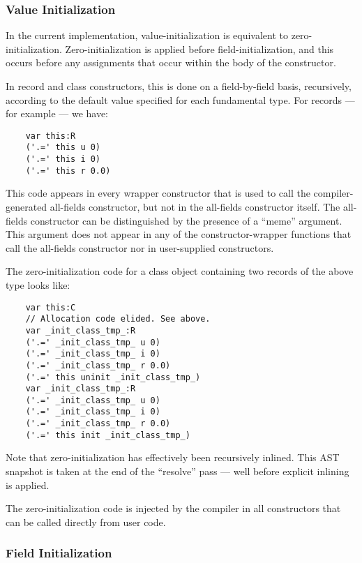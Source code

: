 \subsubsection{Value Initialization}

In the current implementation, value-initialization is equivalent to zero-initialization.
Zero-initialization is applied before field-initialization, and this occurs before any
assignments that occur within the body of the constructor.

In record and class constructors, this is done on a field-by-field basis, recursively,
according to the default value specified for each fundamental type.  For records --- for
example --- we have: 
\begin{verbatim}
    var this:R
    ('.=' this u 0)
    ('.=' this i 0)
    ('.=' this r 0.0)
\end{verbatim}
This code appears in every wrapper constructor that is used to call the compiler-generated
all-fields constructor, but not in the all-fields constructor itself.  The all-fields
constructor can be distinguished by the presence of a ``meme'' argument.  This argument
does not appear in any of the constructor-wrapper functions that call the all-fields
constructor nor in user-supplied constructors.

The zero-initialization code for a class object containing two records of the above type
looks like:
\begin{verbatim}
    var this:C
    // Allocation code elided. See above.
    var _init_class_tmp_:R
    ('.=' _init_class_tmp_ u 0)
    ('.=' _init_class_tmp_ i 0)
    ('.=' _init_class_tmp_ r 0.0)
    ('.=' this uninit _init_class_tmp_)
    var _init_class_tmp_:R
    ('.=' _init_class_tmp_ u 0)
    ('.=' _init_class_tmp_ i 0)
    ('.=' _init_class_tmp_ r 0.0)
    ('.=' this init _init_class_tmp_)
\end{verbatim}
\noindent
Note that zero-initialization has effectively been recursively inlined.  This AST snapshot
is taken at the end of the ``resolve'' pass --- well before explicit inlining is applied.

The zero-initialization code is injected by the compiler in all constructors that can be
called directly from user code.

\subsubsection{Field Initialization}

